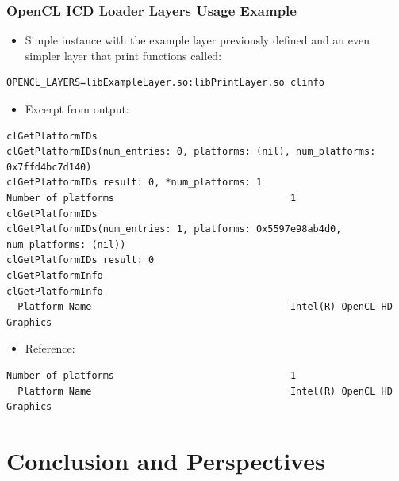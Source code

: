 \documentclass{beamer}
\begin{document}
\begin{frame}[fragile]
  \frametitle{OpenCL ICD Loader Layers Usage Example}
\begin{itemize}
\item Simple instance with the example layer previously defined and an even simpler
      layer that print functions called:
\end{itemize}
\tiny
\begin{verbatim}
OPENCL_LAYERS=libExampleLayer.so:libPrintLayer.so clinfo
\end{verbatim}
\normalsize
\begin{itemize}
\item Excerpt from output:
\end{itemize}
\tiny
\begin{verbatim}
clGetPlatformIDs
clGetPlatformIDs(num_entries: 0, platforms: (nil), num_platforms: 0x7ffd4bc7d140)
clGetPlatformIDs result: 0, *num_platforms: 1
Number of platforms                               1
clGetPlatformIDs
clGetPlatformIDs(num_entries: 1, platforms: 0x5597e98ab4d0, num_platforms: (nil))
clGetPlatformIDs result: 0
clGetPlatformInfo
clGetPlatformInfo
  Platform Name                                   Intel(R) OpenCL HD Graphics
\end{verbatim}
\normalsize
\begin{itemize}
\item Reference:
\end{itemize}
\tiny
\begin{verbatim}
Number of platforms                               1
  Platform Name                                   Intel(R) OpenCL HD Graphics
\end{verbatim}
\end{frame}

\section[Conclusion]{Conclusion and Perspectives}


\end{document}
